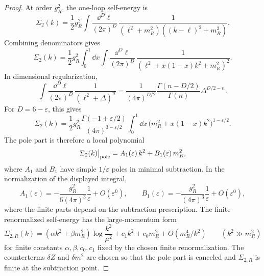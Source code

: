 \begin{proof}
At order \(g_R^2\), the one-loop self-energy is
\[
  \Sigma_{2}(k)
  =
  \frac12 g_R^2
  \int
  \frac{\dd^D\ell}{(2\pi)^D}\,
  \frac{1}
       {(\ell^2+m_R^2)((k-\ell)^2+m_R^2)} .
\]
Combining denominators gives
\[
  \Sigma_{2}(k)
  =
  \frac12 g_R^2
  \int_0^1\dd x
  \int
  \frac{\dd^D\ell}{(2\pi)^D}\,
  \frac{1}
       {\left(\ell^2+x(1-x)k^2+m_R^2\right)^2}.
\]
In dimensional regularization,
\[
  \int\frac{\dd^D\ell}{(2\pi)^D}\,
  \frac1{(\ell^2+\Delta)^n}
  =
  \frac1{(4\pi)^{D/2}}
  \frac{\Gamma(n-D/2)}{\Gamma(n)}
  \Delta^{D/2-n}.
\]
For \(D=6-\varepsilon\), this gives
\[
  \Sigma_2(k)
  =
  \frac12 g_R^2
  \frac{\Gamma(-1+\varepsilon/2)}
       {(4\pi)^{3-\varepsilon/2}}
  \int_0^1\dd x\,
  \bigl(m_R^2+x(1-x)k^2\bigr)^{1-\varepsilon/2}.
\]
The pole part is therefore a local polynomial
\[
  \Sigma_2(k)\big|_{\rm pole}
  =
  A_1(\varepsilon)\,k^2
  +
  B_1(\varepsilon)\,m_R^2,
\]
where \(A_1\) and \(B_1\) have simple \(1/\varepsilon\) poles in minimal
subtraction.  In the normalization of the displayed integral,
\[
  A_1(\varepsilon)
  =
  -\frac{g_R^2}{6(4\pi)^3}\frac1{\varepsilon}
  +O(\varepsilon^0),
  \qquad
  B_1(\varepsilon)
  =
  -\frac{g_R^2}{(4\pi)^3}\frac1{\varepsilon}
  +O(\varepsilon^0),
\]
where the finite parts depend on the subtraction prescription.  The finite
renormalized self-energy has the large-momentum form
\[
  \Sigma_{2,R}(k)
  =
  (\alpha k^2+\beta m_R^2)
  \log\frac{k^2}{\mu^2}
  +c_1k^2+c_0m_R^2+O(m_R^4/k^2)
  \qquad (k^2\gg m_R^2)
\]
for finite constants \(\alpha,\beta,c_0,c_1\) fixed by the chosen finite
renormalization.  The counterterms \(\delta Z\) and \(\delta m^2\) are chosen
so that the pole part is canceled and \(\Sigma_{2,R}\) is finite at the
subtraction point.


\end{proof}
